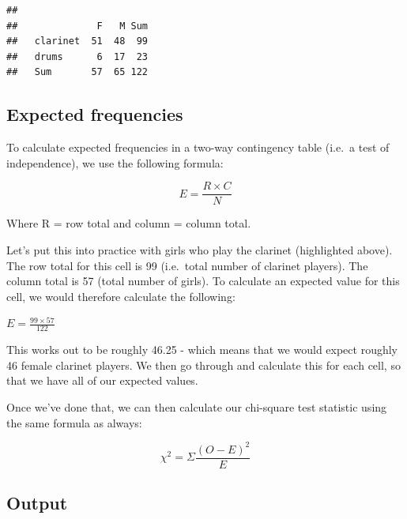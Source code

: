 \documentclass[
]{book}
\newenvironment{Shaded}{\begin{snugshade}}{\end{snugshade}}
\newcommand{\FunctionTok}[1]{\textcolor[rgb]{0.13,0.29,0.53}{\textbf{#1}}}
\newcommand{\NormalTok}[1]{#1}
\newcommand{\OtherTok}[1]{\textcolor[rgb]{0.56,0.35,0.01}{#1}}
\newcommand{\SpecialCharTok}[1]{\textcolor[rgb]{0.81,0.36,0.00}{\textbf{#1}}}
\begin{document}
\begin{Shaded}
\end{Shaded}

\begin{verbatim}
##           
##              F   M Sum
##   clarinet  51  48  99
##   drums      6  17  23
##   Sum       57  65 122
\end{verbatim}

\hypertarget{expected-frequencies}{%
\subsection{Expected frequencies}\label{expected-frequencies}}

To calculate expected frequencies in a two-way contingency table (i.e.~a test of independence), we use the following formula:

\[
E = \frac{R \times C}{N}
\]

Where R = row total and column = column total.

Let's put this into practice with girls who play the clarinet (highlighted above). The row total for this cell is 99 (i.e.~total number of clarinet players). The column total is 57 (total number of girls). To calculate an expected value for this cell, we would therefore calculate the following:

\(E = \frac{99 \times 57}{122}\)

This works out to be roughly 46.25 - which means that we would expect roughly 46 female clarinet players. We then go through and calculate this for each cell, so that we have all of our expected values.

Once we've done that, we can then calculate our chi-square test statistic using the same formula as always:

\[
\chi^2 = \Sigma \frac{(O-E)^2}{E}
\]

\hypertarget{output-1}{%
\subsection{Output}\label{output-1}}
\end{document}
